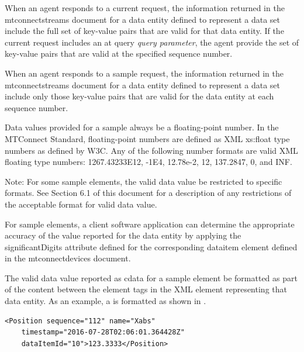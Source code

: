\documentclass{mtconnect}	%
\providecommand{\DIFadd}[1]{{\hspace{0pt}\protect\color{blue}#1}} %
\providecommand{\DIFaddend}{} %
\begin{document}
\DIFadd{When an \gls{agent} responds to a \gls{current request}, the information returned in the \gls{mtconnectstreams} document for a \gls{data entity} defined to represent a \gls{data set} \MUST include the full set of \glspl{key-value pair} that are valid for that \gls{data entity}. If the \gls{current request} includes an \gls{at query} }\textit{\DIFadd{query parameter}}\DIFadd{, the \gls{agent} \MUST provide the set of \glspl{key-value pair} that are valid at the specified \gls{sequence number}.
}

\DIFadd{When an \gls{agent} responds to a \gls{sample request}, the information returned in the \gls{mtconnectstreams} document for a \gls{data entity} defined to represent a \gls{data set} \MUST include only those \glspl{key-value pair} that are valid for the \gls{data entity} at each \gls{sequence number}. 
}

\DIFaddend Data values provided for a \gls{sample} \must always be a floating-point number.   In the MTConnect Standard, floating-point numbers are defined as XML xs:float \gls{type} numbers as defined by W3C.  Any of the following number formats are valid XML floating \gls{type} numbers: 1267.43233E12, -1E4, 12.78e-2, 12, 137.2847, 0, and INF.  

\begin{note}
Note: For some \gls{sample} elements, the \gls{valid data value} \may be restricted to specific formats.  See Section 6.1 of this document for a description of any restrictions of the acceptable format for \gls{valid data value}.

\end{note}

For \gls{sample} elements, a client software application can determine the appropriate accuracy of the value reported for the \gls{data entity} by applying the significantDigits attribute defined for the corresponding \gls{dataitem} element defined in the \gls{mtconnectdevices} document.

The \gls{valid data value} reported as \gls{cdata} for a \gls{sample} element \must be formatted as part of the content between the element tags in the XML element representing that \gls{data entity}.  As an example, a  is formatted as shown in .

\begin{lstlisting}[firstnumber=1,escapechar=|,%
    caption={Example showing CDATA of a DataItem Element},label={lst:example-of-sample-position}]
<Position sequence="112" name="Xabs"
    timestamp="2016-07-28T02:06:01.364428Z" 
    dataItemId="10">123.3333</Position>
\end{lstlisting}
\end{document}
